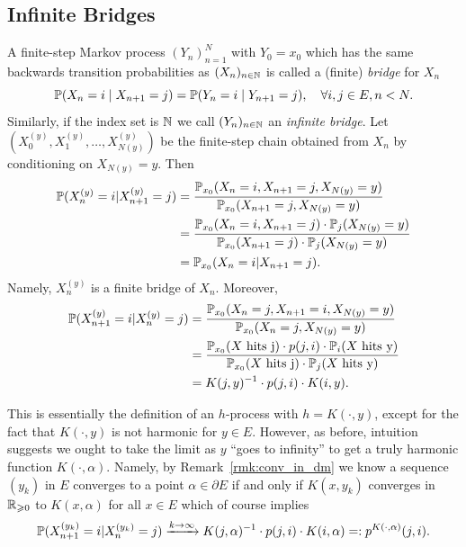 \begin{subappendices}
\subsection{Infinite Bridges} \label{sec:infinite_bridges}

 \indent A finite-step Markov process $(Y_n)_{n = 1}^N$ with $Y_0 = x_0$ which
 has the same backwards transition probabilities as $(X_n)_{n \in \N}$ is called
 a (finite) \textit{bridge} for $X_n$
    \[\P(X_n = i \mid X_{n+1} = j) = \P(Y_n = i \mid Y_{n+1} = j), \quad \forall i,j \in E, n < N.\]
 \noindent Similarly, if the index set is $\N$ we call
  $(Y_n)_{n \in \N}$ an \textit{infinite bridge}. Let $(X^{(y)}_0, X^{(y)}_1, \ldots, X^{(y)}_{N(y)})$
  be the finite-step chain obtained from $X_n$ by conditioning on
  $X_{N(y)} = y$. Then
%
 \begin{align*}
     \P(X^{(y)}_n = i | X^{(y)}_{n+1} = j) & =  \frac{\P_{x_0}(X_n = i, X_{n+1} = j, X_{N(y)} = y)}{\P_{x_0}( X_{n+1} = j, X_{N(y)} = y)} \\
     & =  \frac{\P_{x_0}(X_n = i, X_{n+1} = j) \cdot \P_{j}( X_{N(y)} = y)}{\P_{x_0}( X_{n+1} = j) \cdot \P_j( X_{N(y)} = y)} \\
     & =  \P_{x_0}(X_n = i | X_{n+1} = j).
 \end{align*}
%
 Namely, $X^{(y)}_n$ is a finite bridge of $X_n$. Moreover,
%
 \begin{align*}
     \P(X^{(y)}_{n+1} = i | X^{(y)}_n = j) & =  \frac{\P_{x_0}(X_n = j, X_{n+1} = i, X_{N(y)} = y)}{\P_{x_0}( X_n=j, X_{N(y)} = y)} \\
     & = \frac{\P_{x_0}(X \text{ hits j}) \cdot p(j,i) \cdot \P_i(X \text{ hits y})}{\P_{x_0}(X \text{ hits j}) \cdot \P_j(X \text{ hits y})} \\
     & = K(j,y)^{-1}\cdot p(j,i) \cdot K( i, y).
 \end{align*}

\noindent This is essentially the definition of an $h$-process
with $h = K(\cdot, y)$, except for the fact that $K(\cdot, y)$ is not harmonic for $y \in E$.
However, as before, intuition suggests we ought to take the limit as $y$ ``goes to infinity'' to get a truly
harmonic function $K(\cdot, \alpha)$. Namely, by Remark~\ref{rmk:conv_in_dm} we know a
sequence $(y_k)$ in $E$ converges to a point $\alpha \in \partial E$ if and only if
 $K(x, y_k)$ converges in $\R_{\geq 0}$ to $K(x, \alpha)$ for all $x \in E$ which
 of course implies
    \[\P(X^{(y_k)}_{n+1} = i | X^{(y_k)}_n = j) \xrightarrow{k\to \infty} K(j,\alpha)^{-1}\cdot p(j,i) \cdot K( i, \alpha) =: p^{K(\cdot, \alpha)}(j,i).\]
%


\end{subappendices}
